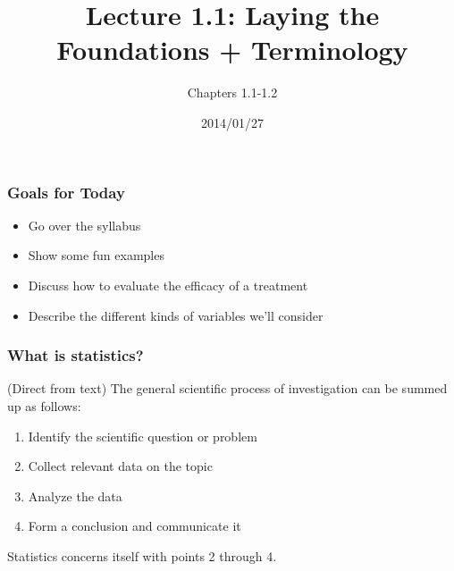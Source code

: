 \documentclass[slides]{beamer}\usepackage[]{graphicx}\usepackage[]{color}
\title{Lecture 1.1: Laying the Foundations + Terminology}
\author{Chapters 1.1-1.2}
\date{2014/01/27}
\newcommand{\blue}[1]{\textcolor{blue2}{#1}}
\begin{document}
\begin{frame}
\titlepage
\end{frame}


\begin{frame}
\frametitle{Goals for Today}
\begin{itemize}
  \item Go over the syllabus 
  \pause\item Show some fun examples 
  \pause\item Discuss how to evaluate the efficacy of a \blue{treatment}
  \pause\item Describe the different kinds of \blue{variables} we'll consider
\end{itemize}

\end{frame}


\begin{frame}
\frametitle{What is statistics?}

(Direct from text) The general scientific process of investigation can be summed up as follows:

\begin{enumerate}
\pause\item Identify the scientific question or problem
\pause\item Collect relevant data on the topic
\pause\item Analyze the data
\pause\item Form a conclusion \pause and \blue{communicate it}
\end{enumerate}

\pause Statistics concerns itself with points 2 through 4.

\end{frame}
\end{document}
